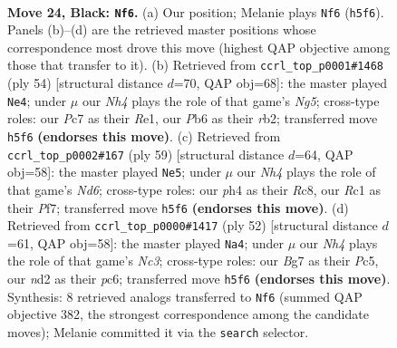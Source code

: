 \documentclass[11pt]{article}
\begin{document}
\clearpage

\begin{figure}[p]\centering
\begin{subfigure}{0.46\textwidth}\centering
\resizebox{\linewidth}{!}{%
\newchessgame
\chessboard[
  setfen={r5k1/P1p3bp/1p4p1/5p1n/4pP1P/R5PB/3NR2K/2r5 b - - 1 24},
  showmover=false,
  pgfstyle=straightmove, color=movearrow, markmove={h5-f6}
]}
\caption{}
\end{subfigure}\hfill
\begin{subfigure}{0.46\textwidth}\centering
\resizebox{\linewidth}{!}{%
\newchessgame
\chessboard[
  setfen={2br2k1/5pbp/p1B3p1/2pPP1N1/5P2/7P/1rp3P1/2R1R1K1 w - - 0 28},
  showmover=false,
  pgfstyle=straightmove, color=movearrow, markmove={g5-e4}
]}
\caption{}
\end{subfigure}
\\[4pt]
\begin{subfigure}{0.46\textwidth}\centering
\resizebox{\linewidth}{!}{%
\newchessgame
\chessboard[
  setfen={r1r5/P3pp2/2Np1kpp/3P4/R1p4P/3n4/1P3PP1/1R3K2 b - - 6 30},
  showmover=false,
  pgfstyle=straightmove, color=movearrow, markmove={d3-e5}
]}
\caption{}
\end{subfigure}\hfill
\begin{subfigure}{0.46\textwidth}\centering
\resizebox{\linewidth}{!}{%
\newchessgame
\chessboard[
  setfen={1r4k1/1r1b2p1/p1p5/2Pp3p/1P1Pp3/P1N4P/1R4P1/5RK1 w - - 2 27},
  showmover=false,
  pgfstyle=straightmove, color=movearrow, markmove={c3-a4}
]}
\caption{}
\end{subfigure}
\caption{\textbf{Move 24, Black: \texttt{Nf6}.} (a) Our position; Melanie plays \texttt{Nf6} (\texttt{h5f6}). Panels (b)--(d) are the retrieved master positions whose correspondence most drove this move (highest QAP objective among those that transfer to it). (b) Retrieved from \texttt{ccrl\_top\_p0001\#1468} (ply 54) [structural distance $d$=70, QAP obj=68]: the master played \texttt{Ne4}; under $\mu$ our \emph{Nh4} plays the role of that game's \emph{Ng5}; cross-type roles: our \emph{P}c7 as their \emph{R}e1, our \emph{P}b6 as their \emph{r}b2; transferred move \texttt{h5f6} \textbf{(endorses this move)}. (c) Retrieved from \texttt{ccrl\_top\_p0002\#167} (ply 59) [structural distance $d$=64, QAP obj=58]: the master played \texttt{Ne5}; under $\mu$ our \emph{Nh4} plays the role of that game's \emph{Nd6}; cross-type roles: our \emph{p}h4 as their \emph{R}c8, our \emph{R}c1 as their \emph{P}f7; transferred move \texttt{h5f6} \textbf{(endorses this move)}. (d) Retrieved from \texttt{ccrl\_top\_p0000\#1417} (ply 52) [structural distance $d$=61, QAP obj=58]: the master played \texttt{Na4}; under $\mu$ our \emph{Nh4} plays the role of that game's \emph{Nc3}; cross-type roles: our \emph{B}g7 as their \emph{P}c5, our \emph{n}d2 as their \emph{p}c6; transferred move \texttt{h5f6} \textbf{(endorses this move)}. Synthesis: 8 retrieved analogs transferred to \texttt{Nf6} (summed QAP objective 382, the strongest correspondence among the candidate moves); Melanie committed it via the \texttt{search} selector.}
\label{fig:thought-m47}
\end{figure}
\end{document}
